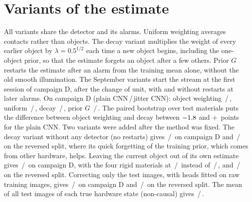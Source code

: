 \documentclass[10pt,twocolumn,letterpaper]{article}
\newcommand{\af}[2]{#1\,/\,#2}
\begin{document}
\section{Variants of the estimate}
\label{sec:variants}
All variants share the detector and its alarms. Uniform weighting averages contacts rather than objects. The decay variant multiplies the weight of every earlier object by $\lambda=0.5^{1/2}$ each time a new object begins, including the one-object prior, so that the estimate forgets an object after a few others. Prior $G$ restarts the estimate after an alarm from the training mean alone, without the old smooth illumination. The September variants start the stream at the first session of campaign D, after the change of unit, with and without restarts at later alarms. On campaign D (plain CNN\,/\,jitter CNN): object weighting \af{\FoDSupTrkStateAcc}{\FoDAugTrkStateAcc}, uniform \af{\FoDSupUniStateAcc}{\FoDAugUniStateAcc}, decay \af{\FoDSupDecayStateAcc}{\FoDAugDecayStateAcc}, prior $G$ \af{\FoDSupPriorGStateAcc}{\FoDAugPriorGStateAcc}. The paired bootstrap over test materials puts the difference between object weighting and decay between $-1.8$ and $+$\FoDSupCiVsDecayHi\ points for the plain CNN. Two variants were added after the method was fixed. The decay variant without any detector (no restarts) gives \af{\FoDSupDecayNoDetStateAcc}{\FoDAugDecayNoDetStateAcc} on campaign D and \af{\FoABRevSupDecayNoDetStateAcc}{\FoABRevAugDecayNoDetStateAcc} on the reversed split, where its quick forgetting of the training prior, which comes from other hardware, helps. Leaving the current object out of its own estimate gives \af{\FoDSupOtherStateAcc}{\FoDAugOtherStateAcc} on campaign D, with the four rigid materials at \af{\FoDSupOtherStateTwo}{\FoDAugOtherStateTwo} instead of \af{\FoDSupTrkStateTwo}{\FoDAugTrkStateTwo}, and \af{\FoABRevSupOtherStateAcc}{\FoABRevAugOtherStateAcc} on the reversed split. Correcting only the test images, with heads fitted on raw training images, gives \af{\FoDSupRawHeadAcc}{\FoDAugRawHeadAcc} on campaign D and \af{\FoABRevSupRawHeadAcc}{\FoABRevAugRawHeadAcc} on the reversed split. The mean of all test images of each true hardware state (non-causal) gives \af{\FoDSupStateMeanStateAcc}{\FoDAugStateMeanStateAcc}.
\end{document}
